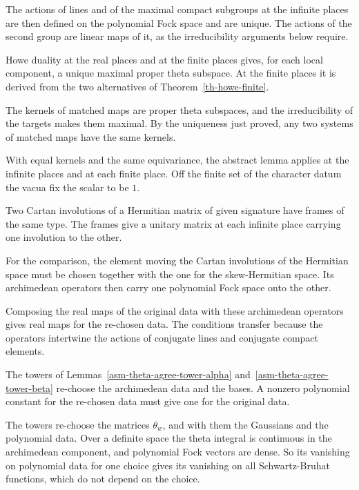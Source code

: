 The actions of lines and of the maximal compact subgroups at the infinite
places are then defined on the polynomial Fock space and are unique. The
actions of the second group are linear maps of it, as the irreducibility
arguments below require.

Howe duality at the real places and at the finite places gives, for each local
component, a unique maximal proper theta subspace. At the finite places it is
derived from the two alternatives of Theorem~\ref{th-howe-finite}.

The kernels of matched maps are proper theta subspaces, and the irreducibility
of the targets makes them maximal. By the uniqueness just proved, any two
systems of matched maps have the same kernels.

With equal kernels and the same equivariance, the abstract lemma applies at
the infinite places and at each finite place. Off the finite set of the
character datum the vacua fix the scalar to be $1$.

Two Cartan involutions of a Hermitian matrix of given signature have frames of
the same type. The frames give a unitary matrix at each infinite place carrying
one involution to the other.

For the comparison, the element moving the Cartan involutions of the Hermitian
space must be chosen together with the one for the skew-Hermitian space. Its
archimedean operators then carry one polynomial Fock space onto the other.

Composing the real maps of the original data with these archimedean operators
gives real maps for the re-chosen data. The conditions transfer because the
operators intertwine the actions of conjugate lines and conjugate compact
elements.

The towers of Lemmas~\ref{asm-theta-agree-tower-alpha}
and~\ref{asm-theta-agree-tower-beta} re-choose the archimedean data and the
bases. A nonzero polynomial constant for the re-chosen data must give one for
the original data.

The towers re-choose the matrices $\theta_w$, and with them the Gaussians and
the polynomial data. Over a definite space the theta integral is continuous in
the archimedean component, and polynomial Fock vectors are dense. So its
vanishing on polynomial data for one choice gives its vanishing on all
Schwartz-Bruhat functions, which do not depend on the choice.

